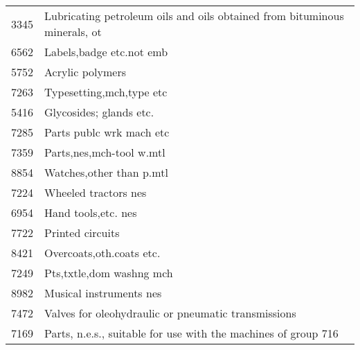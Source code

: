 \documentclass[class=article, crop=false]{standalone}
\begin{document}
\begin{longtable}{ll}
	3345          & Lubricating petroleum oils and oils obtained from bituminous minerals, ot \\
	6562          & Labels,badge etc.not emb                                                  \\
	5752          & Acrylic polymers                                                          \\
	7263          & Typesetting,mch,type etc                                                  \\
	5416          & Glycosides; glands etc.                                                   \\
	7285          & Parts publc wrk mach etc                                                  \\
	7359          & Parts,nes,mch-tool w.mtl                                                  \\
	8854          & Watches,other than p.mtl                                                  \\
	7224          & Wheeled tractors nes                                                      \\
	6954          & Hand tools,etc. nes                                                       \\
	7722          & Printed circuits                                                          \\
	8421          & Overcoats,oth.coats etc.                                                  \\
	7249          & Pts,txtle,dom washng mch                                                  \\
	8982          & Musical instruments nes                                                   \\
	7472          & Valves for oleohydraulic or pneumatic transmissions                       \\
	7169          & Parts, n.e.s., suitable for use with the machines of group 716            \\ \hline
\end{longtable}
\end{document}
